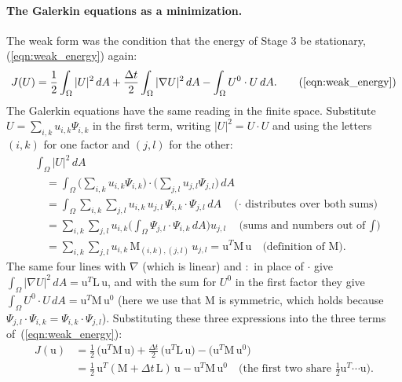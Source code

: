 \paragraph{The Galerkin equations as a minimization.} The weak form was the condition that the energy of Stage 3 be stationary, (\ref{eqn:weak_energy}) again:
\begin{equation*}
J(U) = \frac12 \int_\Omega |U|^2\, dA + \frac{\Delta t}{2} \int_\Omega |\nabla U|^2\, dA - \int_\Omega U^0 \cdot U\, dA . \tag{\ref{eqn:weak_energy}}
\end{equation*}
The Galerkin equations have the same reading in the finite space. Substitute $U = \sum_{i,k} u_{i,k}\Psi_{i,k}$ in the first term, writing $|U|^2 = U\cdot U$ and using the letters $(i, k)$ for one factor and $(j, l)$ for the other:
\begin{align*}
&\int_\Omega |U|^2\, dA \\
&\quad= \int_\Omega \Big(\sum_{i,k} u_{i,k}\Psi_{i,k}\Big)\cdot\Big(\sum_{j,l} u_{j,l}\Psi_{j,l}\Big)\, dA \\
&\quad= \int_\Omega \sum_{i,k}\sum_{j,l} u_{i,k}\,u_{j,l}\, \Psi_{i,k}\cdot\Psi_{j,l}\, dA \quad \text{($\cdot$ distributes over both sums)}\\
&\quad= \sum_{i,k}\sum_{j,l} u_{i,k}\Big(\int_\Omega \Psi_{j,l}\cdot\Psi_{i,k}\, dA\Big) u_{j,l} \quad \text{(sums and numbers out of $\textstyle\int$)}\\
&\quad= \sum_{i,k}\sum_{j,l} u_{i,k}\, \mathrm M_{(i,k),(j,l)}\, u_{j,l} = \mathrm u^T \mathrm M\, \mathrm u \quad \text{(definition of $\mathrm M$)} .
\end{align*}
The same four lines with $\nabla$ (which is linear) and $:$ in place of $\cdot$ give $\int_\Omega |\nabla U|^2\, dA = \mathrm u^T\mathrm L\,\mathrm u$, and with the sum for $U^0$ in the first factor they give $\int_\Omega U^0\cdot U\, dA = \mathrm u^T\mathrm M\,\mathrm u^0$ (here we use that $\mathrm M$ is symmetric, which holds because $\Psi_{j,l}\cdot\Psi_{i,k} = \Psi_{i,k}\cdot\Psi_{j,l}$). Substituting these three expressions into the three terms of~(\ref{eqn:weak_energy}):
\begin{align*}
J(\mathrm u) &= \tfrac12\, \big(\mathrm u^T \mathrm M\, \mathrm u\big) + \tfrac{\Delta t}{2}\, \big(\mathrm u^T \mathrm L\, \mathrm u\big) - \big(\mathrm u^T \mathrm M\, \mathrm u^0\big) \\
&= \tfrac12\, \mathrm u^T (\mathrm M + \Delta t\,\mathrm L)\, \mathrm u - \mathrm u^T \mathrm M\, \mathrm u^0 \quad \text{(the first two share $\tfrac12\mathrm u^T\cdots\mathrm u$)} .
\end{align*}
